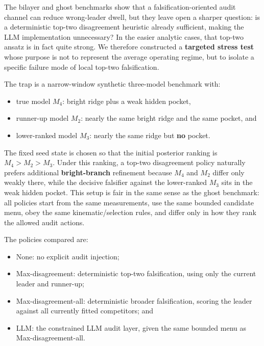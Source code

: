\documentclass[
]{article}
\providecommand{\tightlist}{%
  \setlength{\itemsep}{0pt}\setlength{\parskip}{0pt}}
\begin{document}
The bilayer and ghost benchmarks show that a falsification-oriented
audit channel can reduce wrong-leader dwell, but they leave open a
sharper question: is a deterministic top-two disagreement heuristic
already sufficient, making the LLM implementation unnecessary? In the
easier analytic cases, that top-two ansatz is in fact quite strong. We
therefore constructed a \textbf{targeted stress test} whose purpose is
not to represent the average operating regime, but to isolate a specific
failure mode of local top-two falsification.

The trap is a narrow-window synthetic three-model benchmark with:

\begin{itemize}
\tightlist
\item
  true model \(M_4\): bright ridge plus a weak hidden pocket,
\item
  runner-up model \(M_2\): nearly the same bright ridge and the same
  pocket, and
\item
  lower-ranked model \(M_3\): nearly the same ridge but \textbf{no}
  pocket.
\end{itemize}

The fixed seed state is chosen so that the initial posterior ranking is
\(M_4 > M_2 > M_3\). Under this ranking, a top-two disagreement policy
naturally prefers additional \textbf{bright-branch} refinement because
\(M_4\) and \(M_2\) differ only weakly there, while the decisive
falsifier against the lower-ranked \(M_3\) sits in the weak hidden
pocket. This setup is fair in the same sense as the ghost benchmark: all
policies start from the same measurements, use the same bounded
candidate menu, obey the same kinematic/selection rules, and differ only
in how they rank the allowed audit actions.

The policies compared are:

\begin{itemize}
\tightlist
\item
  None: no explicit audit injection;
\item
  Max-disagreement: deterministic top-two falsification, using only the
  current leader and runner-up;
\item
  Max-disagreement-all: deterministic broader falsification, scoring the
  leader against all currently fitted competitors; and
\item
  LLM: the constrained LLM audit layer, given the same bounded menu as
  Max-disagreement-all.
\end{itemize}
\end{document}
